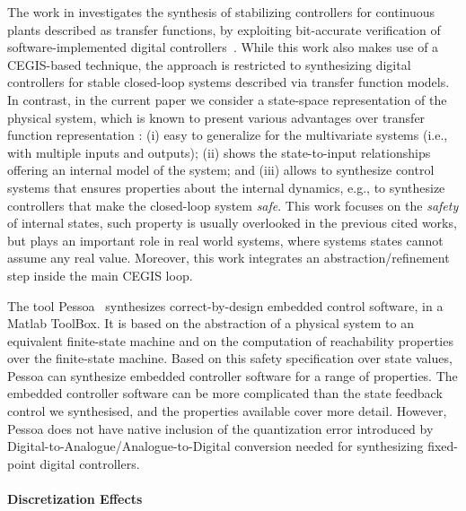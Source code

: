 \documentclass[runningheads,a4paper]{llncs}
\begin{document}
The work in \cite{DBLP:journals/corr/AbateBCCDKK16} investigates the
synthesis of stabilizing controllers for continuous plants described as
transfer functions, by exploiting bit-accurate verification of
software-implemented digital controllers~\cite{IsmailBCFF15,Bessa16}.  While this work
also makes use of a CEGIS-based technique, the approach is restricted to
synthesizing digital controllers for stable closed-loop systems described
via transfer function models.  In contrast, in the current paper we consider
a state-space representation of the physical system, which is known to present
various advantages over transfer function representation \cite{Astrom08}: (i) 
easy to generalize for the multivariate systems (i.e., with multiple inputs 
and outputs); (ii) shows the state-to-input relationships offering an internal 
model of the system; and (iii) allows to synthesize control systems that ensures
properties about the internal dynamics, e.g., to synthesize controllers that make
the closed-loop system \emph{safe}. This work focuses on the \emph{safety} of 
internal states, such property is usually overlooked in the previous cited 
works, but plays an important role in real world systems, where systems states 
cannot assume any real value. Moreover, this work integrates an
abstraction/refinement step inside the main CEGIS loop.

The tool Pessoa~\cite{mazo2010pessoa} synthesizes
correct-by-design embedded control software, in a Matlab ToolBox.  It is based on the abstraction
of a physical system to an equivalent finite-state machine and on the
computation of reachability properties over the finite-state machine.  Based
on this safety specification over state values, Pessoa can synthesize
embedded controller software for a range of properties.
The embedded controller software can be more complicated than
the state feedback control we synthesised, and the properties 
available cover more detail.
However, Pessoa does not have native inclusion of the quantization error
introduced by Digital-to-Analogue/Analogue-to-Digital conversion needed for
synthesizing fixed-point digital controllers.


\paragraph{Discretization Effects}
\end{document}

